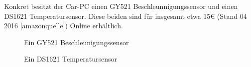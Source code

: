 Konkret besitzt der Car-PC einen GY521 Beschleunnigungssensor und einen DS1621 Temperatursensor. Diese beiden sind für insgesamt etwa 15€ (Stand 04 2016 [amazonquelle]) Online erhältlich.

\begin{figure}[!htb]\centering
   \begin{minipage}{0.49\textwidth}
     \caption{Ein GY521 Beschleunigungssensor \cite{PERT.CH3-carpc.gy521}}\label{Fig:imgGY521}
   \end{minipage}
   \begin {minipage}{0.49\textwidth}
     \caption{Ein DS1621 Temperatursensor \cite{PERT.CH3-carpc.ds1621}}\label{Fig:imgDS1621}
   \end{minipage}
\end{figure}

